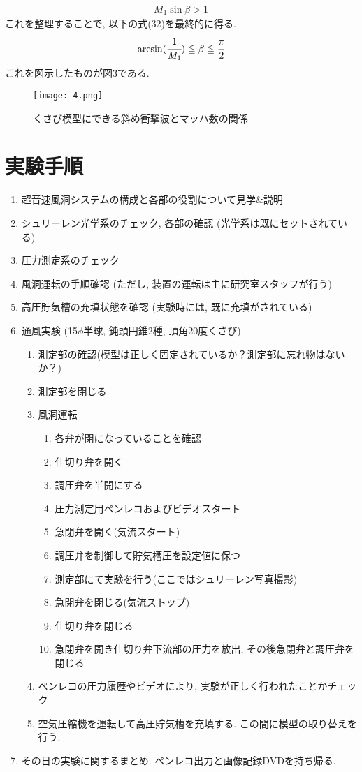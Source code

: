 \documentclass[12pt]{jsarticle}
\begin{document}
\begin{eqnarray}
M_1\sin\beta > 1
\end{eqnarray}
これを整理することで, 以下の式(32)を最終的に得る.
\begin{eqnarray}
\arcsin(\cfrac{1}{M_1}) \leqq \beta \leqq \cfrac{\pi}{2}
\end{eqnarray}
これを図示したものが図3である.
\begin{figure}[htbp]
\begin{center}
\texttt{[image: 4.png]}
\caption{くさび模型にできる斜め衝撃波とマッハ数の関係}
\end{center}
\end{figure}

\section{実験手順}
\begin{enumerate}
\item 超音速風洞システムの構成と各部の役割について見学\&説明
\item シュリーレン光学系のチェック, 各部の確認 (光学系は既にセットされている)
\item 圧力測定系のチェック
\item 風洞運転の手順確認 (ただし, 装置の運転は主に研究室スタッフが行う)
\item 高圧貯気槽の充填状態を確認 (実験時には, 既に充填がされている)
\item 通風実験 (15$\phi$半球, 鈍頭円錐2種, 頂角20度くさび)
\begin{enumerate}
\item 測定部の確認(模型は正しく固定されているか？測定部に忘れ物はないか？)
\item 測定部を閉じる
\item 風洞運転
\begin{enumerate}
\item 各弁が閉になっていることを確認
\item 仕切り弁を開く
\item 調圧弁を半開にする
\item 圧力測定用ペンレコおよびビデオスタート
\item 急閉弁を開く(気流スタート)
\item 調圧弁を制御して貯気槽圧を設定値に保つ
\item 測定部にて実験を行う(ここではシュリーレン写真撮影)
\item 急閉弁を閉じる(気流ストップ)
\item 仕切り弁を閉じる
\item 急閉弁を開き仕切り弁下流部の圧力を放出, その後急閉弁と調圧弁を閉じる
\end{enumerate}
\item ペンレコの圧力履歴やビデオにより, 実験が正しく行われたことかチェック
\item 空気圧縮機を運転して高圧貯気槽を充填する. この間に模型の取り替えを行う.
\end{enumerate}
\item その日の実験に関するまとめ. ペンレコ出力と画像記録DVDを持ち帰る.
\end{enumerate}
\end{document}
